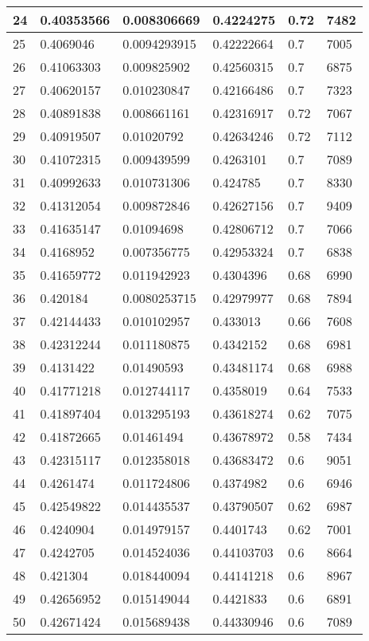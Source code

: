 \begin{longtable}{|l|l|l|l|l|l|}
24 & 0.40353566 & 0.008306669 & 0.4224275 & 0.72 & 7482 \\ \hline 
25 & 0.4069046 & 0.0094293915 & 0.42222664 & 0.7 & 7005 \\ \hline 
26 & 0.41063303 & 0.009825902 & 0.42560315 & 0.7 & 6875 \\ \hline 
27 & 0.40620157 & 0.010230847 & 0.42166486 & 0.7 & 7323 \\ \hline 
28 & 0.40891838 & 0.008661161 & 0.42316917 & 0.72 & 7067 \\ \hline 
29 & 0.40919507 & 0.01020792 & 0.42634246 & 0.72 & 7112 \\ \hline 
30 & 0.41072315 & 0.009439599 & 0.4263101 & 0.7 & 7089 \\ \hline 
31 & 0.40992633 & 0.010731306 & 0.424785 & 0.7 & 8330 \\ \hline 
32 & 0.41312054 & 0.009872846 & 0.42627156 & 0.7 & 9409 \\ \hline 
33 & 0.41635147 & 0.01094698 & 0.42806712 & 0.7 & 7066 \\ \hline 
34 & 0.4168952 & 0.007356775 & 0.42953324 & 0.7 & 6838 \\ \hline 
35 & 0.41659772 & 0.011942923 & 0.4304396 & 0.68 & 6990 \\ \hline 
36 & 0.420184 & 0.0080253715 & 0.42979977 & 0.68 & 7894 \\ \hline 
37 & 0.42144433 & 0.010102957 & 0.433013 & 0.66 & 7608 \\ \hline 
38 & 0.42312244 & 0.011180875 & 0.4342152 & 0.68 & 6981 \\ \hline 
39 & 0.4131422 & 0.01490593 & 0.43481174 & 0.68 & 6988 \\ \hline 
40 & 0.41771218 & 0.012744117 & 0.4358019 & 0.64 & 7533 \\ \hline 
41 & 0.41897404 & 0.013295193 & 0.43618274 & 0.62 & 7075 \\ \hline 
42 & 0.41872665 & 0.01461494 & 0.43678972 & 0.58 & 7434 \\ \hline 
43 & 0.42315117 & 0.012358018 & 0.43683472 & 0.6 & 9051 \\ \hline 
44 & 0.4261474 & 0.011724806 & 0.4374982 & 0.6 & 6946 \\ \hline 
45 & 0.42549822 & 0.014435537 & 0.43790507 & 0.62 & 6987 \\ \hline 
46 & 0.4240904 & 0.014979157 & 0.4401743 & 0.62 & 7001 \\ \hline 
47 & 0.4242705 & 0.014524036 & 0.44103703 & 0.6 & 8664 \\ \hline 
48 & 0.421304 & 0.018440094 & 0.44141218 & 0.6 & 8967 \\ \hline 
49 & 0.42656952 & 0.015149044 & 0.4421833 & 0.6 & 6891 \\ \hline 
50 & 0.42671424 & 0.015689438 & 0.44330946 & 0.6 & 7089 \\ \hline 
\end{longtable}